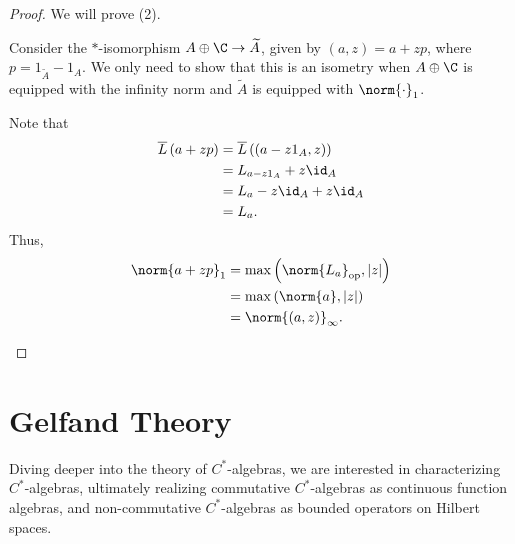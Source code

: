 \documentclass[10pt]{mypackage}
\DeclareMathOperator{\op}{op}
\begin{document}
\begin{proof}
  We will prove (2).
  \begin{description}[font=\normalfont]
    \item[(2)] Consider the $\ast$-isomorphism $A\oplus \C \rightarrow \widetilde{A}$, given by $\left(a,z\right) = a + zp$, where $p = 1_{\widetilde{A}} - 1_{A}$. We only need to show that this is an isometry when $A\oplus \C$ is equipped with the infinity norm and $\widetilde{A}$ is equipped with $\norm{\cdot}_1$.\newline

      Note that
      \begin{align*}
        \overline{L}\left(a + zp\right) &= \overline{L}\left(\left(a-z1_{A},z\right)\right)\\
                                        &= L_{a-z1_A} + z\id_A\\
                                        &= L_a - z\id_A + z\id_A\\
                                        &= L_a.
      \end{align*}
      Thus,
      \begin{align*}
        \norm{a+zp}_1 &= \max\left(\norm{L_a}_{\op},\left\vert z \right\vert\right)\\
                      &= \max\left(\norm{a},\left\vert z \right\vert\right)\\
                      &= \norm{\left(a,z\right)}_{\infty}.
      \end{align*}
  \end{description}
\end{proof}
\section{Gelfand Theory}%
Diving deeper into the theory of $C^{\ast}$-algebras, we are interested in characterizing $C^{\ast}$-algebras, ultimately realizing commutative $C^{\ast}$-algebras as continuous function algebras, and non-commutative $C^{\ast}$-algebras as bounded operators on Hilbert spaces.
\end{document}
